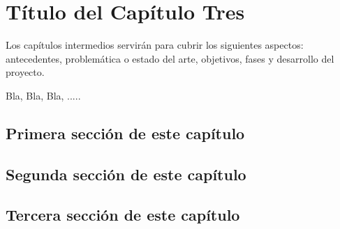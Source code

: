

\chapter{Título del Capítulo Tres}
\label{chapter:tres}


Los capítulos intermedios servirán para cubrir los siguientes aspectos:
antecedentes, problemática o estado del arte, objetivos, fases y desarrollo del proyecto.

Bla, Bla, Bla, .....

\section{Primera sección de este capítulo}
\label{3:sec1}

\section{Segunda sección de este capítulo}
\label{3:sec2}

\section{Tercera sección de este capítulo}
\label{:sec3}
